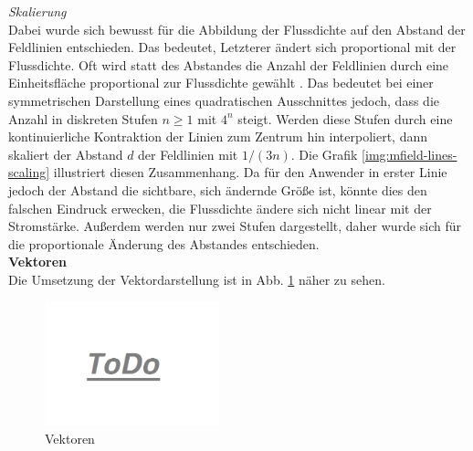\textit{Skalierung}\\
Dabei wurde sich bewusst für die Abbildung der Flussdichte auf den Abstand der Feldlinien entschieden. Das bedeutet, Letzterer ändert sich proportional mit der Flussdichte. Oft wird statt des Abstandes die Anzahl der Feldlinien durch eine Einheitsfläche proportional zur Flussdichte gewählt \cite{Kilian03}. Das bedeutet bei einer symmetrischen Darstellung eines quadratischen Ausschnittes jedoch, dass die Anzahl in diskreten Stufen $n \geq 1$ mit $4^{n}$ steigt. Werden diese Stufen durch eine kontinuierliche Kontraktion der Linien zum Zentrum hin interpoliert, dann skaliert der Abstand $d$ der Feldlinien mit $1/(3n)$. Die Grafik \ref{img:mfield-lines-scaling} illustriert diesen Zusammenhang. Da für den Anwender in erster Linie jedoch der Abstand die sichtbare, sich ändernde Größe ist, könnte dies den falschen Eindruck erwecken, die Flussdichte ändere sich nicht linear mit der Stromstärke. Außerdem werden nur zwei Stufen dargestellt, daher wurde sich für die proportionale Änderung des Abstandes entschieden.\\

\textbf{Vektoren}\\
Die Umsetzung der Vektordarstellung ist in Abb. \ref{img:mfield-vectors} näher zu sehen.
\begin{figure}[H]
	\centering
	\includegraphics[width=0.45\textwidth]{images/todo.jpg}
	\caption{Vektoren}
	\label{img:mfield-vectors}
\end{figure}
\vspace{4px}
\begin{center}
	\\
\end{center}
\vspace{6px}

